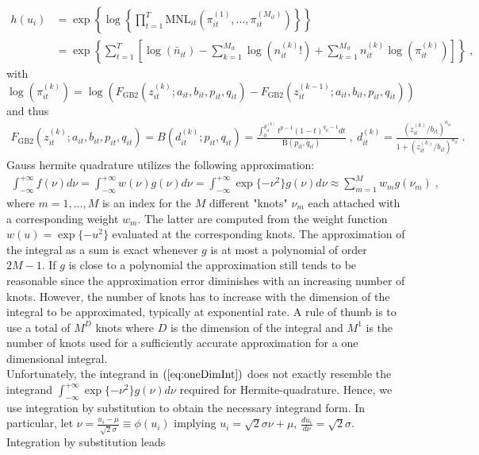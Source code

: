 \documentclass[a4paper,12pt]{scrartcl} %
\newcommand{\sumt}{\sum_{t=1}^T}
\newcommand{\prodt}{\prod_{t=1}^T}
\begin{document}
\begin{align}\label{eq:transFunc}
h(u_i)&=
\exp\left\{\log\left\{\prodt \text{MNL}_{it}\left(\pi_{it}^{(1)},\ldots,\pi_{it}^{(M_{it})}\right) \right\}\right\} \nonumber \\
&=\exp
\left\{
\sumt \left[
\log(\bar{n}_{it})
-
\sum_{k=1}^{M_{it}} \log(n_{it}^{(k)}!)
+
\sum_{k=1}^{M_{it}} n_{it}^{(k)}\log(\pi_{it}^{(k)})
\right]
\right\}\;,
\end{align}
with $\log(\pi_{it}^{(k)})=\log\left(F_{\text{GB2}}(z_{it}^{(k)};a_{it},b_{it},p_{it},q_{it})-F_{\text{GB2}}(z_{it}^{(k-1)};a_{it},b_{it},p_{it},q_{it})\right)$ and thus
\begin{align*}
F_{\text{GB2}}(z_{it}^{(k)};a_{it},b_{it},p_{it},q_{it})=B(d_{it}^{(k)};p_{it},q_{it})=\frac{\int_{0}^{d_{it}^{(k)}} t^{p-1}(1-t)^{q_{it}-1}dt}{\text{B}(p_{it},q_{it})}\;,~d_{it}^{(k)}=\frac{(z_{it}^{(k)}/b_{it})^{a_{it}}}{1+(z_{it}^{(k)}/b_{it})^{a_{it}}}\;.
\end{align*}
Gauss hermite quadrature utilizes the following approximation:
\begin{align*}
\int_{-\infty}^{+\infty}f(\nu)d\nu=\int_{-\infty}^{+\infty} w(\nu)g(\nu)d\nu=\int_{-\infty}^{+\infty} \exp\{-\nu^2\}g(\nu)d\nu\approx \sum_{m=1}^{M}w_mg(\nu_m)\;,
\end{align*}
where $m=1,\ldots,M$ is an index for the $M$ different "knots" $\nu_m$ each attached with a corresponding weight $w_m$. The latter are computed from the weight function $w(u)= \exp\{-u^2\}$ evaluated at the corresponding knots. The approximation of the integral as a sum is exact whenever $g$ is at most a polynomial of order $2M-1$. If $g$ is close to a polynomial the approximation still tends to be reasonable since the approximation error diminishes with an increasing number of knots. However, the number of knots has to increase with the dimension of the integral to be approximated, typically at exponential rate. A rule of thumb is to use a total of $M^D$ knots where $D$ is the dimension of the integral and $M^1$ is the number of knots used for a sufficiently accurate approximation for a one dimensional integral.\\
Unfortunately, the integrand in $(\ref{eq:oneDimInt})$ does not exactly resemble the integrand $\int_{-\infty}^{+\infty} \exp\{-\nu^2\}g(\nu)d\nu$ required for Hermite-quadrature. Hence, we use integration by substitution to obtain the necessary integrand form. In particular, let $\nu=\frac{u_i-\mu}{\sqrt{2}\sigma}\equiv \phi(u_i)$ implying $u_i=\sqrt{2}\sigma \nu+\mu$, $\frac{du_i}{d\nu}=\sqrt{2}\sigma$. Integration by substitution leads
\end{document}
